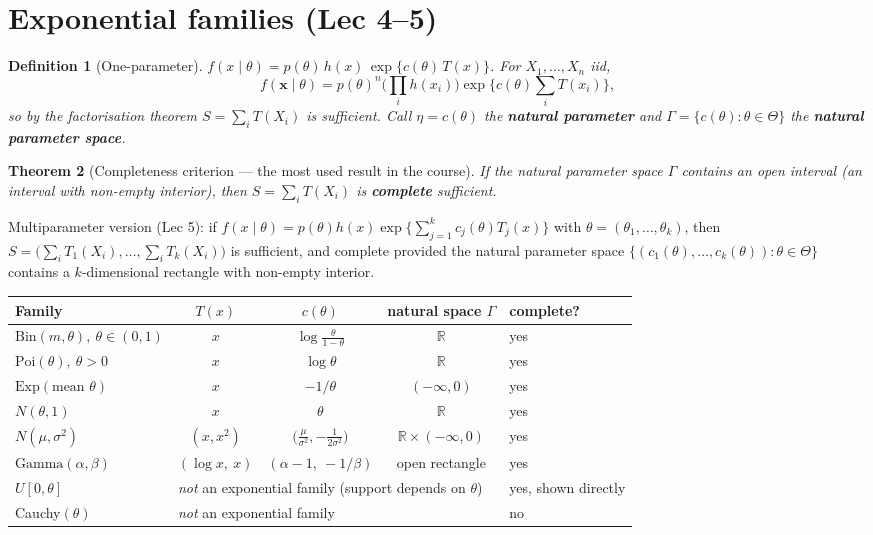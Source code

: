 \documentclass[11pt]{article}
\newtheorem{theorem}{Theorem}[section]
\newtheorem{definition}[theorem]{Definition}
\theoremstyle{remark}
\newcommand{\R}{\mathbb{R}}
\begin{document}
\section{Exponential families (Lec 4--5)}

\begin{definition}[One-parameter]
$f(x\mid\theta)=p(\theta)\,h(x)\,\exp\{c(\theta)\,T(x)\}$.
For $X_1,\dots,X_n$ iid,
\[
f(\mathbf{x}\mid\theta)=p(\theta)^n\Big(\prod_i h(x_i)\Big)\exp\Big\{c(\theta)\sum_i T(x_i)\Big\},
\]
so by the factorisation theorem $S=\sum_i T(X_i)$ is sufficient. Call $\eta=c(\theta)$ the
\textbf{natural parameter} and $\Gamma=\{c(\theta):\theta\in\Theta\}$ the \textbf{natural
parameter space}.
\end{definition}

\begin{theorem}[Completeness criterion --- the most used result in the course]
If the natural parameter space $\Gamma$ contains an open interval (an interval with
non-empty interior), then $S=\sum_i T(X_i)$ is \textbf{complete} sufficient.
\end{theorem}

Multiparameter version (Lec 5): if
$f(x\mid\theta)=p(\theta)h(x)\exp\{\sum_{j=1}^k c_j(\theta)T_j(x)\}$ with
$\theta=(\theta_1,\dots,\theta_k)$, then $S=\big(\sum_i T_1(X_i),\dots,\sum_i T_k(X_i)\big)$
is sufficient, and complete provided the natural parameter space
$\{(c_1(\theta),\dots,c_k(\theta)):\theta\in\Theta\}$ contains a $k$-dimensional
rectangle with non-empty interior.

\begin{center}
\renewcommand{\arraystretch}{1.35}
\begin{tabular}{@{}lcccl@{}}
\toprule
Family & $T(x)$ & $c(\theta)$ & natural space $\Gamma$ & complete? \\
\midrule
$\mathrm{Bin}(m,\theta),\ \theta\in(0,1)$ & $x$ & $\log\frac{\theta}{1-\theta}$ & $\R$ & yes \\
$\mathrm{Poi}(\theta),\ \theta>0$ & $x$ & $\log\theta$ & $\R$ & yes \\
$\mathrm{Exp}(\text{mean }\theta)$ & $x$ & $-1/\theta$ & $(-\infty,0)$ & yes \\
$N(\theta,1)$ & $x$ & $\theta$ & $\R$ & yes \\
$N(\mu,\sigma^2)$ & $(x,x^2)$ & $\big(\tfrac{\mu}{\sigma^2},-\tfrac{1}{2\sigma^2}\big)$ & $\R\times(-\infty,0)$ & yes \\
$\mathrm{Gamma}(\alpha,\beta)$ & $(\log x,\ x)$ & $(\alpha-1,\ -1/\beta)$ & open rectangle & yes \\
\midrule
$U[0,\theta]$ & \multicolumn{3}{l}{\emph{not} an exponential family (support depends on $\theta$)} & yes, shown directly \\
Cauchy$(\theta)$ & \multicolumn{3}{l}{\emph{not} an exponential family} & no \\
\bottomrule
\end{tabular}
\end{center}
\end{document}
